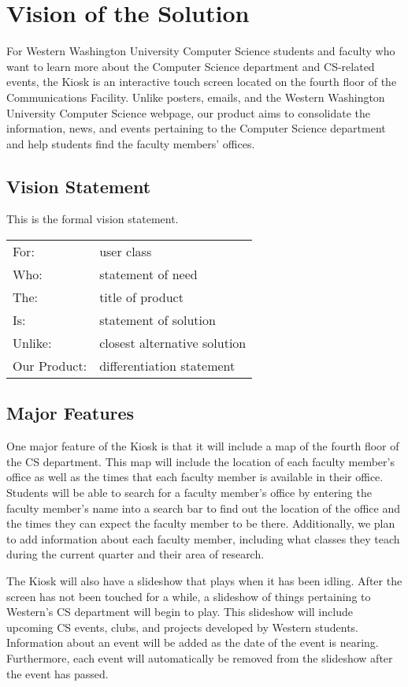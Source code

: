 \section{Vision of the Solution}
For Western Washington University Computer Science students and faculty who want to learn more about the Computer Science department and CS-related events, the Kiosk is an interactive touch screen located on the fourth floor of the Communications Facility. Unlike posters, emails, and the Western Washington University Computer Science webpage, our product aims to consolidate the information, news, and events pertaining to the Computer Science department and help students find the faculty members’ offices.

\subsection{Vision Statement}
 This is the formal vision statement.  
 \begin{tabular}{ll}
 For:         &user class\\
 Who:         &statement of need\\
 The:         &title of product\\
 Is:          &statement of solution\\
 Unlike:      &closest alternative solution\\
 Our Product: &differentiation statement  \\
 \end{tabular}  
\subsection{Major Features}
One major feature of the Kiosk is that it will include a map of the fourth floor of the CS department. This map will include the location of each faculty member’s office as well as the times that each faculty member is available in their office. Students will be able to search for a faculty member’s office by entering the faculty member’s name into a search bar to find out the location of the office and the times they can expect the faculty member to be there. Additionally, we plan to add information about each faculty member, including what classes they teach during the current quarter and their area of research.
 
The Kiosk will also have a slideshow that plays when it has been idling. After the screen has not been touched for a while, a slideshow of things pertaining to Western’s CS department will begin to play. This slideshow will include upcoming CS events, clubs, and projects developed by Western students. Information about an event will be added as the date of the event is nearing. Furthermore, each event will automatically be removed from the slideshow after the event has passed.


